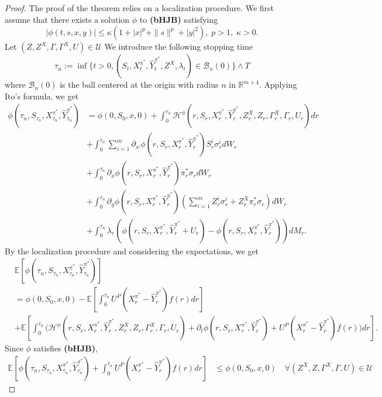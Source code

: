 \documentclass[11pt,a4paper]{article}
\theoremstyle{thmstyleone}%
\theoremstyle{thmstyletwo}%
\theoremstyle{thmstylethree}%
\begin{document}
\begin{proof}
The proof of the theorem relies on a localization procedure. We first assume that there exists a solution $\phi$ to \textbf{(bHJB)} satisfying \[|\phi(t,s,x,y)|\leq \kappa(1+|x|^p+\|s\|^p+|y|^2),\; p>1,\; \kappa>0.\]  Let $(Z,Z^X,\Gamma,\Gamma^X,U)\in \mathcal U$ We introduce the following stopping time
\[
    \tau_n := \inf\{ t > 0, (S_t, X^{\pi^*}_t, \hat Y^{\pi^*}_t, Z^X,\lambda_t) \in \mathcal{B}_n(0)\} \wedge T
\]
where $\mathcal{B}_n(0)$ is the ball centered at the origin with radius $n$ in $\mathbb{R}^{m+4}$.
Applying Ito's formula, we get
\begin{align*}
    \phi(\tau_n, S_{\tau_n}, X^{\pi^*}_{\tau_n}, \hat Y^{\pi^*}_{\tau_n}) 
    &= \phi(0, S_{0}, x, 0) + \int_{0}^{\tau_n} \mathcal H^\phi(r,S_r,X^{\pi^*}_r,\hat Y^{\pi^*}_r,Z^X_r,Z_r,\Gamma^X_r,\Gamma_r,U_r) dr \\
    &+\int_{0}^{\tau_n} \sum_{i=1}^m \partial_{s^i} \phi(r,S_r,X^{\pi^*}_r, \hat Y^{\pi^*}_r) S_r^i \sigma^i_r dW_r\\
    &+\int_{0}^{\tau_n} \partial_{x} \phi(r,S_r,X^{\pi^*}_r, \hat Y^{\pi^*}_r) \pi_r^* \sigma_r dW_r\\
    &+\int_{0}^{\tau_n} \partial_{y} \phi(r,S_r,X^{\pi^*}_r, \hat Y^{\pi^*}_r) (\sum_{i=1}^m Z^i_r \sigma^i_r +Z_r^X\pi_r^* \sigma_r )dW_r\\
    &+\int_{0}^{\tau_n} \lambda_r(\phi(r,S_r,X^{\pi^*}_r, \hat Y^{\pi^*}_r + U_r) - \phi(r,S_r,X^{\pi^*}_r,\hat Y^{\pi^*}_r)) dM_r.
\end{align*}
By the localization procedure and considering the expectations, we get
\begin{align*}
    &\mathbb{E}[\phi(\tau_n, S_{\tau_n}, X^{\pi^*}_{\tau_n}, \hat Y^{\pi^*}_{\tau_n})]\\
    &= \phi(0, S_{0}, x, 0)- \mathbb{E}[\int_{0}^{\tau_n}U^P(X^{\pi^*}_r - \hat Y^{\pi^*}_r)f(r) dr]\\
    &+\mathbb{E}[\int_{0}^{\tau_n} \mathcal (\mathcal H^\phi(r,S_r,X^{\pi^*}_r,\hat Y^{\pi^*}_r,Z^X_r,Z_r,\Gamma^X_r,\Gamma_r,U_r) + \partial_t \phi(r,S_r,X^{\pi^*}_r,\hat Y^{\pi^*}_r) + U^P(X^{\pi^*}_r -  \hat Y^{\pi^*}_r)f(r) )dr].
\end{align*}
Since $\phi$ satisfies \textbf{(bHJB)}, 
\begin{align*}
    \mathbb{E}[\phi(\tau_n, S_{\tau_n}, X^{\pi^*}_{\tau_n}, \hat Y^{\pi^*}_{\tau_n})+\int_{0}^{\tau_n}U^P(X^{\pi^*}_r -  \hat Y^{\pi^*}_r)f(r) dr] 
    &\leq \phi(0, S_{0}, x, 0) \quad \forall (Z^X,Z,\Gamma^X,\Gamma,U)\in \mathcal U
\end{align*}

\end{proof}
\end{document}
